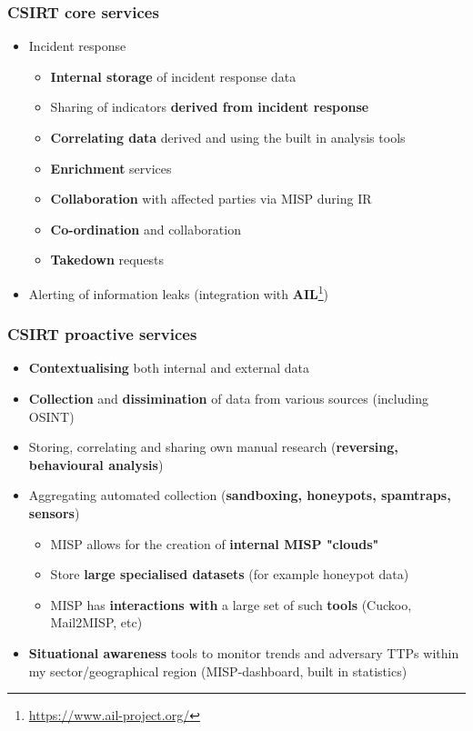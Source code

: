 \begin{frame}
\frametitle{CSIRT core services}
\begin{itemize}
	\item Incident response
	\begin{itemize}
		\item {\bf Internal storage} of incident response data
		\item Sharing of indicators {\bf derived from incident response}
		\item {\bf Correlating data} derived and using the built in analysis tools
		\item {\bf Enrichment} services
		\item {\bf Collaboration} with affected parties via MISP during IR
		\item {\bf Co-ordination} and collaboration
		\item {\bf Takedown} requests
	\end{itemize}
	\item Alerting of information leaks (integration with {\bf AIL}\footnote{\url{https://www.ail-project.org/}})
\end{itemize}
\end{frame}

\begin{frame}
\frametitle{CSIRT proactive services}
\begin{itemize}
	\item {\bf Contextualising} both internal and external data
	\item {\bf Collection} and {\bf dissimination} of data from various sources (including OSINT)
	\item Storing, correlating and sharing own manual research ({\bf reversing, behavioural analysis})
	\item Aggregating automated collection ({\bf sandboxing, honeypots, spamtraps, sensors})
	\begin{itemize}
		\item MISP allows for the creation of {\bf internal MISP "clouds"}
		\item Store {\bf large specialised datasets} (for example honeypot data)
		\item MISP has {\bf interactions with} a large set of such {\bf tools} (Cuckoo, Mail2MISP, etc)
	\end{itemize}
	\item {\bf Situational awareness} tools to monitor trends and adversary TTPs within my sector/geographical region (MISP-dashboard, built in statistics)
\end{itemize}
\end{frame}

